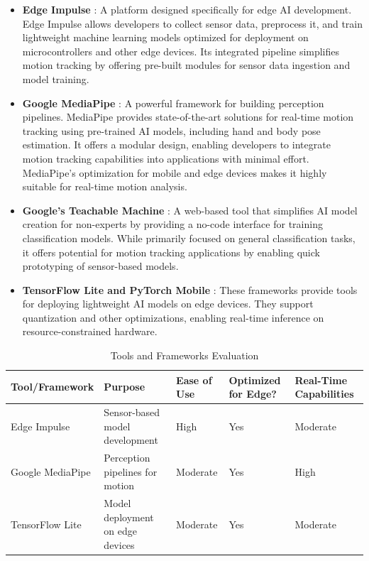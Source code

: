 \begin{itemize}
    \item \textbf{Edge Impulse} \cite{web:Edge_Impulse}: A platform designed specifically for edge AI development. Edge Impulse allows developers to collect sensor data, preprocess it, and train lightweight machine learning models optimized for deployment on microcontrollers and other edge devices. Its integrated pipeline simplifies motion tracking by offering pre-built modules for sensor data ingestion and model training.

    \item \textbf{Google MediaPipe} \cite{web:Google_Mediapipe}: A powerful framework for building perception pipelines. MediaPipe provides state-of-the-art solutions for real-time motion tracking using pre-trained AI models, including hand and body pose estimation. It offers a modular design, enabling developers to integrate motion tracking capabilities into applications with minimal effort. MediaPipe’s optimization for mobile and edge devices makes it highly suitable for real-time motion analysis.

    \item \textbf{Google’s Teachable Machine} \cite{web:Google_TeachableMachine}: A web-based tool that simplifies AI model creation for non-experts by providing a no-code interface for training classification models. While primarily focused on general classification tasks, it offers potential for motion tracking applications by enabling quick prototyping of sensor-based models.

    \item \textbf{TensorFlow Lite and PyTorch Mobile} \cite{web:TensorFlowLite}: These frameworks provide tools for deploying lightweight AI models on edge devices. They support quantization and other optimizations, enabling real-time inference on resource-constrained hardware.
\end{itemize}

\begin{table}[htb]
\centering
\caption{Tools and Frameworks Evaluation}
\label{tab:tab_3}
\begin{tabular}{| >{\centering\arraybackslash}m{3.5cm} | >{\centering\arraybackslash}m{3cm} | >{\centering\arraybackslash}m{2cm} | >{\centering\arraybackslash}m{2cm} | >{\centering\arraybackslash}m{2cm} |}
\toprule
\textbf{Tool/Framework} & \textbf{Purpose} & \textbf{Ease of Use} & \textbf{Optimized for Edge?} & \textbf{Real-Time Capabilities} \\
\midrule
Edge Impulse & Sensor-based model development & High & Yes & Moderate \\
\hline
Google MediaPipe & Perception pipelines for motion & Moderate & Yes & High \\
\hline
TensorFlow Lite & Model deployment on edge devices & Moderate & Yes & Moderate \\
\bottomrule
\end{tabular}
\end{table}

